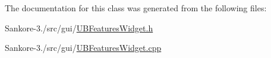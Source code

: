 The documentation for this class was generated from the following files\-:\begin{DoxyCompactItemize}
\item 
Sankore-\/3./src/gui/\hyperlink{_u_b_features_widget_8h}{U\-B\-Features\-Widget.\-h}\item 
Sankore-\/3./src/gui/\hyperlink{_u_b_features_widget_8cpp}{U\-B\-Features\-Widget.\-cpp}\end{DoxyCompactItemize}
